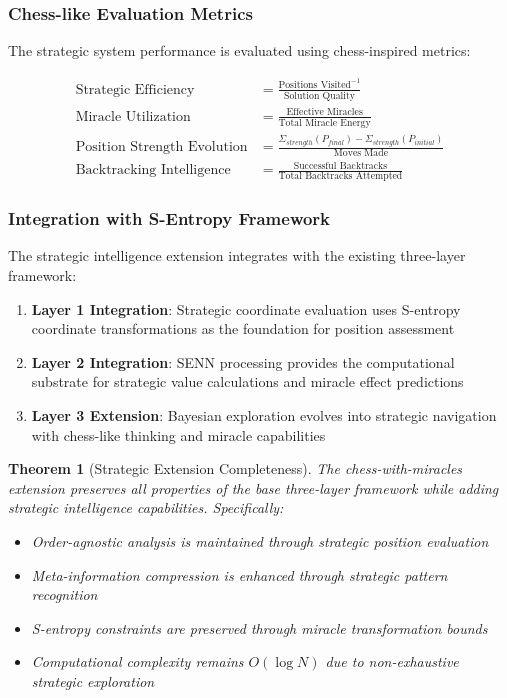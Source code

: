 \documentclass[12pt,a4paper]{article}
\newtheorem{theorem}{Theorem}
\begin{document}
\subsubsection{Chess-like Evaluation Metrics}

The strategic system performance is evaluated using chess-inspired metrics:

\begin{align}
\text{Strategic Efficiency} &= \frac{\text{Positions Visited}^{-1}}{\text{Solution Quality}} \\
\text{Miracle Utilization} &= \frac{\text{Effective Miracles}}{\text{Total Miracle Energy}} \\
\text{Position Strength Evolution} &= \frac{\Sigma_{strength}(P_{final}) - \Sigma_{strength}(P_{initial})}{\text{Moves Made}} \\
\text{Backtracking Intelligence} &= \frac{\text{Successful Backtracks}}{\text{Total Backtracks Attempted}}
\end{align}

\subsubsection{Integration with S-Entropy Framework}

The strategic intelligence extension integrates with the existing three-layer framework:

\begin{enumerate}
\item \textbf{Layer 1 Integration}: Strategic coordinate evaluation uses S-entropy coordinate transformations as the foundation for position assessment

\item \textbf{Layer 2 Integration}: SENN processing provides the computational substrate for strategic value calculations and miracle effect predictions

\item \textbf{Layer 3 Extension}: Bayesian exploration evolves into strategic navigation with chess-like thinking and miracle capabilities
\end{enumerate}

\begin{theorem}[Strategic Extension Completeness]
The chess-with-miracles extension preserves all properties of the base three-layer framework while adding strategic intelligence capabilities. Specifically:
\begin{itemize}
\item Order-agnostic analysis is maintained through strategic position evaluation
\item Meta-information compression is enhanced through strategic pattern recognition
\item S-entropy constraints are preserved through miracle transformation bounds
\item Computational complexity remains $O(\log N)$ due to non-exhaustive strategic exploration
\end{itemize}
\end{theorem}
\end{document}
